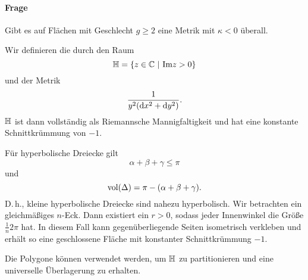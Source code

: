 \paragraph{Frage}
Gibt es auf Flächen mit Geschlecht $g\geq 2$ eine Metrik mit $\kappa<0$ überall.

Wir definieren die  durch den Raum
\[ \H = \set{z \in \C}{\Im z > 0} \]
und der Metrik
\[ \frac{1}{y^2(\text{d} x^2 + \text{d} y^2)}. \]
$\mathbb{H}$ ist dann vollständig als Riemannsche Mannigfaltigkeit und hat eine konstante Schnittkrümmung von $-1$.

Für hyperbolische Dreiecke gilt
\[ \alpha + \beta + \gamma \leq \pi \]
und
\[ \mathrm{vol}(\Delta) = \pi - (\alpha + \beta + \gamma). \]
D.\,h., kleine hyperbolische Dreiecke sind nahezu hyperbolisch. Wir betrachten ein gleichmäßiges $n$-Eck. Dann existiert ein $r> 0$, sodass jeder Innenwinkel die Größe $\frac{1}{n}2\pi$ hat. In diesem Fall kann gegenüberliegende Seiten isometrisch verkleben und erhält so eine geschlossene Fläche mit konstanter Schnittkrümmung $-1$.

\Bem{}
Die Polygone können verwendet werden, um $\mathbb{H}$ zu partitionieren und eine universelle Überlagerung zu erhalten.
